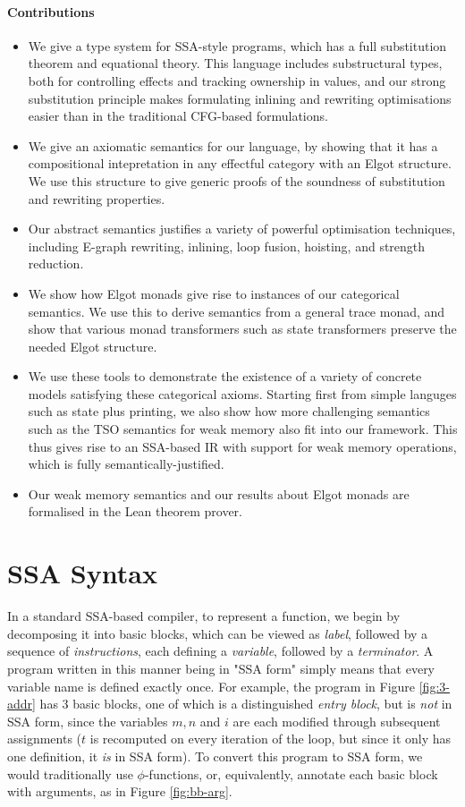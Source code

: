 \documentclass[acmsmall,screen,review]{acmart}
\begin{document}
\paragraph{Contributions} 

\begin{itemize}
\item We give a type system for SSA-style programs, which has a full
substitution theorem and equational theory. This language includes substructural
types, both for controlling effects and tracking ownership in values, and our
strong substitution principle makes formulating inlining and rewriting
optimisations easier than in the traditional CFG-based formulations. 
\item We give an axiomatic semantics for our language, by showing that it has a
compositional intepretation in any effectful category with an Elgot structure.
We use this structure to give generic proofs of the soundness of substitution
and rewriting properties.
\item Our abstract semantics justifies a variety of powerful optimisation
techniques, including E-graph rewriting, inlining, loop fusion, hoisting, and
strength reduction. 
\item We show how Elgot monads give rise to instances of our categorical
semantics. We use this to derive semantics from a general trace monad, and show
that various monad transformers such as state transformers preserve the needed
Elgot structure. 
\item We use these tools to demonstrate the existence of a variety of concrete
models satisfying these categorical axioms. Starting first from simple languges
such as state plus printing, we also show how more challenging semantics such as
the TSO semantics for weak memory also fit into our framework. This thus gives
rise to an SSA-based IR with support for weak memory operations, which is fully
semantically-justified.
\item Our weak memory semantics and our results about Elgot monads are
formalised in the Lean theorem prover.
\end{itemize}

\section{SSA Syntax}

In a standard SSA-based compiler, to represent a function, we begin by
decomposing it into basic blocks, which can be viewed as \textit{label},
followed by a sequence of \textit{instructions}, each defining a
\textit{variable}, followed by a \textit{terminator}. A program written in this
manner being in "SSA form" simply means that every variable name is defined
exactly once. For example, the program in Figure \ref{fig:3-addr} has 3 basic blocks, one of which is a distinguished \textit{entry block}, but is \textit{not} in SSA form, since the variables \(m, n\) and \(i\) are each modified through subsequent assignments (\(t\) is recomputed on every iteration of the loop, but since it only has one definition, it \textit{is} in SSA form). To convert this program to SSA form, we would traditionally use \(\phi\)-functions, or, equivalently, annotate each basic block with arguments, as in Figure \ref{fig:bb-arg}.
\end{document}
